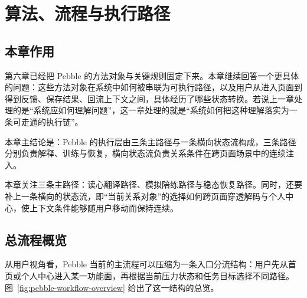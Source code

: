 \chapter{算法、流程与执行路径}

\section{本章作用}

第六章已经把 Pebble 的方法对象与关键规则固定下来。本章继续回答一个更具体的问题：这些方法对象在系统中如何被串联为可执行路径，以及用户从进入页面到得到反馈、保存结果、回流上下文之间，具体经历了哪些状态转换。若说上一章处理的是“系统应如何理解问题”，这一章处理的就是“系统如何把这种理解落实为一条可走通的执行链”。

本章主结论是：Pebble 的执行层由三条主路径与一条横向状态流构成，三条路径分别负责解释、训练与恢复，横向状态流负责关系条件在跨页面场景中的连续注入。

本章关注三条主路径：读心翻译路径、模拟陪练路径与稳态恢复路径。同时，还要补上一条横向的状态流，即“当前关系对象”的选择如何跨页面穿透解码与个人中心，使上下文条件能够随用户移动而保持连续。

\section{总流程概览}

从用户视角看，Pebble 当前的主流程可以压缩为一条入口分流结构：用户先从首页或个人中心进入某一功能面，再根据当前压力状态和任务目标选择不同路径。图~\ref{fig:pebble-workflow-overview} 给出了这一结构的总览。

